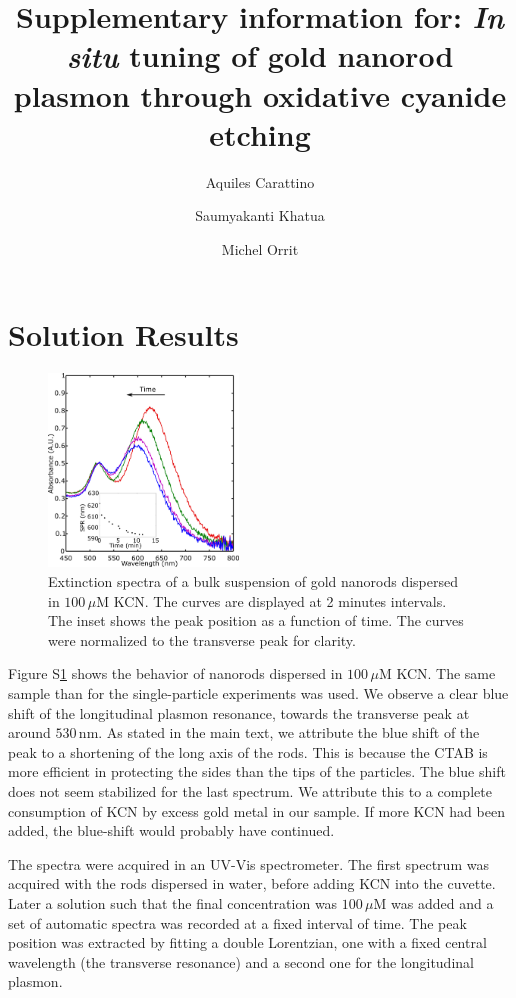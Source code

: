 \documentclass[journal=jpccck]{achemso}
\author{Aquiles Carattino}
\affiliation[Leiden]
{Huygens-Kamerlingh Onnes, Leiden, The Netherlands}
\author{Saumyakanti Khatua}
\affiliation{Indian Institute of Technology- Gandhinagar, Ahmedabad,  India}
\author{Michel Orrit}
\affiliation[Leiden]
{Huygens-Kamerlingh Onnes, Leiden, The Netherlands}
\title{Supplementary information for: \textit{In situ} tuning of gold nanorod plasmon through oxidative cyanide
etching}
\newcommand{\nm}{\ensuremath{\,\textrm{nm}}}
\newcommand{\uM}{\ensuremath{\,\mu\textrm{M}}}
\begin{document}
\maketitle

\section{Solution Results}
\begin{figure}[htp]
 \centering
 \includegraphics[width=0.45\textwidth]{Figures/04_Supporting/01_Bulk/01_bulk.png}
 \caption{Extinction spectra of a bulk suspension of gold nanorods dispersed in
 $100\uM$ KCN. The curves are displayed at 2 minutes intervals. The
 inset shows the peak position as a function of time. The curves were normalized
 to the transverse peak for clarity.}
 \label{fig:Bulk}
\end{figure}

Figure S\ref{fig:Bulk} shows the behavior of nanorods dispersed in $100\uM$ KCN.
The same sample than for the single-particle experiments was used.
We observe a clear blue shift of the longitudinal plasmon resonance, towards the
transverse peak at around $530\nm$. As stated in the main text, we attribute the
blue shift of the peak to a shortening of the long axis of the rods. This is
because the CTAB is more efficient in protecting the sides than the tips of the
particles. The blue shift does not seem stabilized for the last spectrum. We
attribute this to a complete consumption of KCN by excess gold metal in our
sample. If more KCN had been added, the blue-shift would probably have
continued.

The spectra were acquired in an UV-Vis spectrometer. The first spectrum was
acquired with the rods dispersed in water, before adding KCN into the cuvette.
Later a solution such that the final concentration was $100\uM$ was added and a
set of automatic spectra was recorded at a fixed interval of time. The peak
position was extracted by fitting a double Lorentzian, one with a fixed central
wavelength (the transverse resonance) and a second one for the longitudinal
plasmon.
\end{document}

